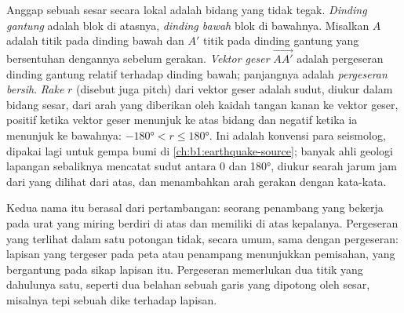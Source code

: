 \begin{definition}\label{def:b1:faults-folds-fabrics:fault-elements}
Anggap sebuah sesar secara lokal adalah bidang yang tidak tegak. \emph{Dinding gantung} adalah blok di atasnya, \emph{dinding bawah} blok di bawahnya. Misalkan $A$ adalah titik pada dinding bawah dan $A'$ titik pada dinding gantung yang bersentuhan dengannya sebelum gerakan. \emph{Vektor geser} $\overrightarrow{AA'}$ adalah pergeseran dinding gantung relatif terhadap dinding bawah; panjangnya adalah \emph{pergeseran bersih}. \emph{Rake} $r$ (disebut juga pitch) dari vektor geser adalah sudut, diukur dalam bidang sesar, dari arah  yang diberikan oleh kaidah tangan kanan ke vektor geser, positif ketika vektor geser menunjuk ke atas bidang dan negatif ketika ia menunjuk ke bawahnya: $\ang{-180} < r \le \ang{180}$. Ini adalah konvensi para seismolog, dipakai lagi untuk gempa bumi di \cref{ch:b1:earthquake-source}; banyak ahli geologi lapangan sebaliknya mencatat sudut antara 0 dan \ang{180}, diukur searah jarum jam dari  yang dilihat dari atas, dan menambahkan arah gerakan dengan kata-kata.
\end{definition}

Kedua nama itu berasal dari pertambangan: seorang penambang yang bekerja pada urat yang miring berdiri di atas  dan memiliki  di atas kepalanya. Pergeseran yang terlihat dalam satu potongan tidak, secara umum, sama dengan pergeseran: lapisan yang tergeser pada peta atau penampang menunjukkan pemisahan, yang bergantung pada sikap lapisan itu. Pergeseran memerlukan dua titik yang dahulunya satu, seperti dua belahan sebuah garis yang dipotong oleh sesar, misalnya tepi sebuah dike terhadap lapisan.

